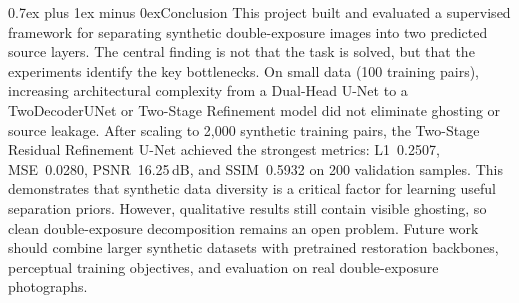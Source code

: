 \documentclass[conference]{IEEEtran}
\makeatletter
\def\section{\@startsection{section}{1}{\z@}{1.5ex plus 1.5ex minus 0.5ex}%
  {0.7ex plus 1ex minus 0ex}{\normalfont\normalsize\centering\scshape\bfseries}}
\makeatother
\begin{document}
\section{Conclusion}
This project built and evaluated a supervised framework for separating synthetic double-exposure images into two predicted source layers. The central finding is not that the task is solved, but that the experiments identify the key bottlenecks. On small data (100 training pairs), increasing architectural complexity from a Dual-Head U-Net to a TwoDecoderUNet or Two-Stage Refinement model did not eliminate ghosting or source leakage. After scaling to 2,000 synthetic training pairs, the Two-Stage Residual Refinement U-Net achieved the strongest metrics: L1~0.2507, MSE~0.0280, PSNR~16.25\,dB, and SSIM~0.5932 on 200 validation samples. This demonstrates that synthetic data diversity is a critical factor for learning useful separation priors. However, qualitative results still contain visible ghosting, so clean double-exposure decomposition remains an open problem. Future work should combine larger synthetic datasets with pretrained restoration backbones, perceptual training objectives, and evaluation on real double-exposure photographs.
\end{document}
